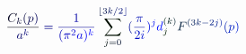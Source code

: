 \documentclass[12pt]{article}
\begin{document}
\makeatletter
\renewcommand*{\@textcolor}[3]{%
  \protect\leavevmode
  \begingroup
    \color#1{#2}#3%
  \endgroup
}
\makeatother
\begin{displaymath}
\mathcolor[RGB]{0,0,15}{\frac { \mathcolor[RGB]{0,0,30}{C} _ { \mathcolor[RGB]{0,0,45}{k} } \mathcolor[RGB]{0,0,60}{(} \mathcolor[RGB]{0,0,75}{p} \mathcolor[RGB]{0,0,90}{)} } { \mathcolor[RGB]{0,0,105}{a} ^ { \mathcolor[RGB]{0,0,120}{k} } } } \mathcolor[RGB]{0,0,135}{=} \mathcolor[RGB]{0,0,150}{\frac { \mathcolor[RGB]{0,0,165}{1} } { \mathcolor[RGB]{0,0,180}{(} \mathcolor[RGB]{0,0,195}{\pi} ^ { \mathcolor[RGB]{0,0,210}{2} } \mathcolor[RGB]{0,0,225}{a} \mathcolor[RGB]{0,0,240}{)} ^ { \mathcolor[RGB]{0,0,255}{k} } } } \mathcolor[RGB]{0,15,0}{\sum} _ { \mathcolor[RGB]{0,15,15}{j} \mathcolor[RGB]{0,15,30}{=} \mathcolor[RGB]{0,15,45}{0} } ^ { \mathcolor[RGB]{0,15,60}{\lfloor} \mathcolor[RGB]{0,15,75}{3} \mathcolor[RGB]{0,15,90}{k} \mathcolor[RGB]{0,15,105}{/} \mathcolor[RGB]{0,15,120}{2} \mathcolor[RGB]{0,15,135}{\rfloor} } \mathcolor[RGB]{0,15,150}{(} \mathcolor[RGB]{0,15,165}{\frac { \mathcolor[RGB]{0,15,180}{\pi} } { \mathcolor[RGB]{0,15,195}{2} \mathcolor[RGB]{0,15,210}{i} } } \mathcolor[RGB]{0,15,225}{)} ^ { \mathcolor[RGB]{0,15,240}{j} } \mathcolor[RGB]{0,15,255}{d} _ { \mathcolor[RGB]{0,30,0}{j} } ^ { \mathcolor[RGB]{0,30,15}{(} \mathcolor[RGB]{0,30,30}{k} \mathcolor[RGB]{0,30,45}{)} } \mathcolor[RGB]{0,30,60}{F} ^ { \mathcolor[RGB]{0,30,75}{(} \mathcolor[RGB]{0,30,90}{3} \mathcolor[RGB]{0,30,105}{k} \mathcolor[RGB]{0,30,120}{-} \mathcolor[RGB]{0,30,135}{2} \mathcolor[RGB]{0,30,150}{j} \mathcolor[RGB]{0,30,165}{)} } \mathcolor[RGB]{0,30,180}{(} \mathcolor[RGB]{0,30,195}{p} \mathcolor[RGB]{0,30,210}{)}
\end{displaymath}
\end{document}

